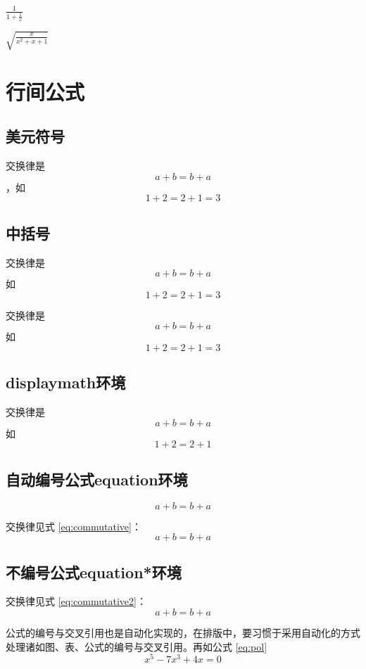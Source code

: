 \documentclass{article}
\begin{document}
	$\frac{1}{1 + \frac{1}{x}}$
	
	$\sqrt{\frac{x}{x^2 + x + 1}}$
	
	\section{行间公式}
	
	\subsection{美元符号}
	
	交换律是 $$a+b=b+a$$，如$$1+2=2+1=3$$ %
	
	\subsection{中括号}
	
	交换律是
	$$a+b=b+a$$
	如
	$$1+2=2+1=3$$
	
	交换律是
	\[a+b=b+a\]
	如
	\[1+2=2+1=3\]
	
	\subsection{displaymath环境}
	
	交换律是
	\begin{displaymath}
		a + b = b + a
	\end{displaymath}
	如
	\begin{displaymath}
		1 + 2 = 2 + 1
	\end{displaymath}

	\subsection{自动编号公式equation环境}
	
	\begin{equation}
		a + b = b + a
	\end{equation}
	
	交换律见式 \ref{eq:commutative}：
	\begin{equation}
	a + b = b + a \label{eq:commutative}
	\end{equation}

	\subsection{不编号公式equation*环境} %

		交换律见式 \ref{eq:commutative2}：
		\begin{equation*}
			a + b = b + a \label{eq:commutative2}
		\end{equation*}
	
	公式的编号与交叉引用也是自动化实现的，在排版中，要习惯于采用自动化的方式处理诸如图、表、公式的编号与交叉引用。再如公式 \ref{eq:pol}
	\begin{equation}
		x^5 - 7x^3 + 4x = 0 \label{eq:pol}
	\end{equation}
	
\end{document}
